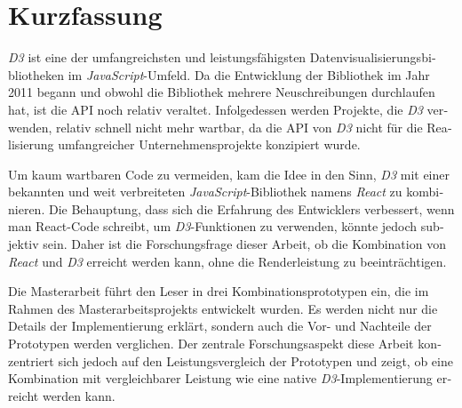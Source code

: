 \chapter{Kurzfassung}

\begin{german}
\emph{D3} ist eine der umfangreichsten und leistungsfähigsten Datenvisualisierungsbibliotheken im \emph{JavaScript}-Umfeld. Da die Entwicklung der Bibliothek im Jahr 2011 begann und obwohl die Bibliothek mehrere Neuschreibungen durchlaufen hat, ist die API noch relativ veraltet. Infolgedessen werden Projekte, die \emph{D3} verwenden, relativ schnell nicht mehr wartbar, da die API von \emph{D3} nicht für die Realisierung umfangreicher Unternehmensprojekte konzipiert wurde.

Um kaum wartbaren Code zu vermeiden, kam die Idee in den Sinn, \emph{D3} mit einer bekannten und weit verbreiteten \emph{JavaScript}-Bibliothek namens \emph{React} zu kombinieren. Die Behauptung, dass sich die Erfahrung des Entwicklers verbessert, wenn man React-Code schreibt, um \emph{D3}-Funktionen zu verwenden, könnte jedoch subjektiv sein. Daher ist die Forschungsfrage dieser Arbeit, ob die Kombination von \emph{React} und \emph{D3} erreicht werden kann, ohne die Renderleistung zu beeinträchtigen.

Die Masterarbeit führt den Leser in drei Kombinationsprototypen ein, die im Rahmen des Masterarbeitsprojekts entwickelt wurden. Es werden nicht nur die Details der Implementierung erklärt, sondern auch die Vor- und Nachteile der Prototypen werden verglichen. Der zentrale Forschungsaspekt diese Arbeit konzentriert sich jedoch auf den Leistungsvergleich der Prototypen und zeigt, ob eine Kombination mit vergleichbarer Leistung wie eine native \emph{D3}-Implementierung erreicht werden kann.
\end{german}